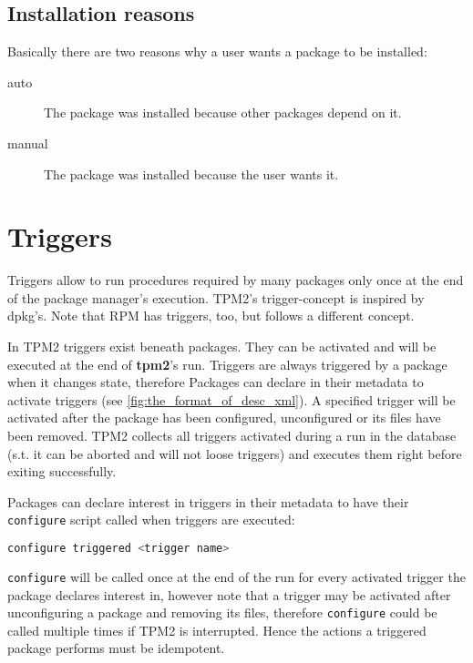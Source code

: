 \documentclass[a4paper]{scrartcl}
\newcommand{\program}[1]{\textbf{#1}}
\begin{document}
	
	\subsection{Installation reasons}
	\label{ssec:installation_reasons}
	
	Basically there are two reasons why a user wants a package to be installed:
	
	\begin{description}
		\item[auto] The package was installed because other packages depend on it.
		\item[manual] The package was installed because the user wants it.
	\end{description}


	\section{Triggers}
	\label{sec:triggers}
	
	Triggers allow to run procedures required by many packages only once at the end of the package manager's execution. TPM2's trigger-concept is inspired by dpkg's. Note that RPM has triggers, too, but follows a different concept.
	
	In TPM2 triggers exist beneath packages. They can be activated and will be executed at the end of \program{tpm2}'s run. Triggers are always triggered by a package when it changes state, therefore Packages can declare in their metadata to activate triggers (see \ref{fig:the_format_of_desc_xml}). A specified trigger will be activated after the package has been configured, unconfigured or its files have been removed. TPM2 collects all triggers activated during a run in the database (s.t. it can be aborted and will not loose triggers) and executes them right before exiting successfully.
	
	Packages can declare interest in triggers in their metadata to have their \texttt{configure} script called when triggers are executed:
	
	\begin{lstlisting}[language=bash]
		configure triggered <trigger name>
	\end{lstlisting}
	
	\texttt{configure} will be called once at the end of the run for every activated trigger the package declares interest in, however note that a trigger may be activated after unconfiguring a package and removing its files, therefore \texttt{configure} could be called multiple times if TPM2 is interrupted. Hence the actions a triggered package performs must be idempotent.
	
\end{document}

